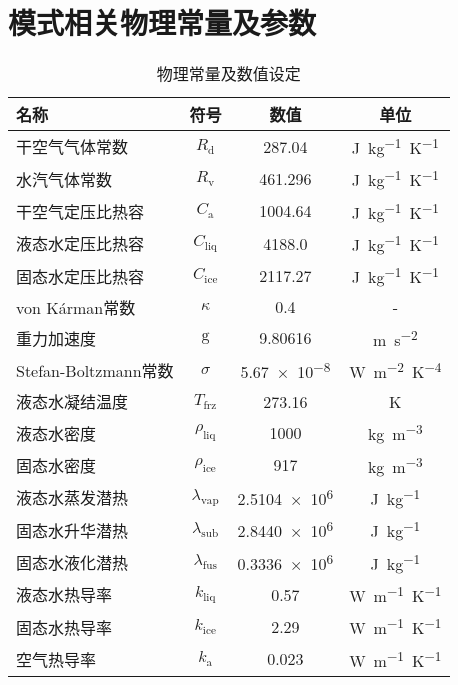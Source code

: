 \chapter{模式相关物理常量及参数}\label{模式相关物理常数参数}

\begin{table}[htbp]
  \centering
  \caption{物理常量及数值设定}
  \label{tab:物理常数}
  \begin{tabular}{lccc}
    \toprule
    名称                 & 符号                     & 数值           & 单位                    \\ \midrule
    干空气气体常数       & $R_{\mathrm{d}}$         & \num{287.04}   & \unit{J.kg^{-1}.K^{-1}} \\
    水汽气体常数         & $R_{\mathrm{v}}$         & \num{461.296}  & \unit{J.kg^{-1}.K^{-1}} \\
    干空气定压比热容     & $C_{\mathrm{a}}$         & \num{1004.64}  & \unit{J.kg^{-1}.K^{-1}} \\
    液态水定压比热容     & $C_{\mathrm{liq}}$       & \num{4188.0}   & \unit{J.kg^{-1}.K^{-1}} \\
    固态水定压比热容     & $C_{\mathrm{ice}}$       & \num{2117.27}  & \unit{J.kg^{-1}.K^{-1}} \\
    von K\'arman常数     & $\kappa$                 & \num{0.4}      & -                       \\
    重力加速度           & ${\mathrm {g}}$          & \num{9.80616}  & \unit{m.s^{-2}}         \\
    Stefan-Boltzmann常数 & $\sigma$                 & \num{5.67e-8}  & \unit{W.m^{-2}.K^{-4}}  \\
    液态水凝结温度       & $T_{\mathrm {frz}} $     & \num{273.16}   & K                       \\
    液态水密度           & $\rho_{\mathrm{liq}}$    & \num{1000}     & \unit{kg.m^{-3}}        \\
    固态水密度           & $\rho_{\mathrm{ice}}$    & \num{917}      & \unit{kg.m^{-3}}        \\
    液态水蒸发潜热       & $\lambda_{\mathrm{vap}}$ & \num{2.5104e6} & \unit{J.kg^{-1}}        \\
    固态水升华潜热       & $\lambda_{\mathrm{sub}}$ & \num{2.8440e6} & \unit{J.kg^{-1}}        \\
    固态水液化潜热       & $\lambda_{\mathrm{fus}}$ & \num{0.3336e6} & \unit{J.kg^{-1}}        \\
    液态水热导率         & $k_{\mathrm{liq}}$       & \num{0.57}     & \unit{W.m^{-1}.K^{-1}}  \\
    固态水热导率         & $k_{\mathrm{ice}}$       & \num{2.29}     & \unit{W.m^{-1}.K^{-1}}  \\
    空气热导率           & $k_{\mathrm{a}} $        & \num{0.023}    & \unit{W.m^{-1}.K^{-1}}  \\ \bottomrule
  \end{tabular}
\end{table}

